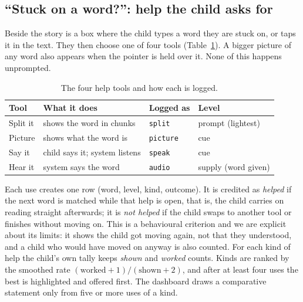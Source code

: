 \documentclass[manuscript, screen, review, anonymous]{acmart}
\begin{document}
\subsection{``Stuck on a word?'': help the child asks for}
\label{sec:help}
Beside the story is a box where the child types a word they are stuck on, or taps it in the text. They then choose one of four tools (Table~\ref{tab:tools}). A bigger picture of any word also appears when the pointer is held over it. None of this happens unprompted.

\begin{table}[h]
\caption{The four help tools and how each is logged.}
\label{tab:tools}
\begin{tabular}{@{}llll@{}}
\toprule
Tool & What it does & Logged as & Level \\
\midrule
Split it & shows the word in chunks & \texttt{split} & prompt (lightest) \\
Picture & shows what the word is & \texttt{picture} & cue \\
Say it & child says it; system listens & \texttt{speak} & cue \\
Hear it & system says the word & \texttt{audio} & supply (word given) \\
\bottomrule
\end{tabular}
\end{table}

Each use creates one row (word, level, kind, outcome). It is credited as \emph{helped} if the next word is matched while that help is open, that is, the child carries on reading straight afterwards; it is \emph{not helped} if the child swaps to another tool or finishes without moving on. This is a behavioural criterion and we are explicit about its limits: it shows the child got moving again, not that they understood, and a child who would have moved on anyway is also counted. For each kind of help the child's own tally keeps \emph{shown} and \emph{worked} counts. Kinds are ranked by the smoothed rate $(\text{worked}+1)/(\text{shown}+2)$, and after at least four uses the best is highlighted and offered first. The dashboard draws a comparative statement only from five or more uses of a kind.
\end{document}
